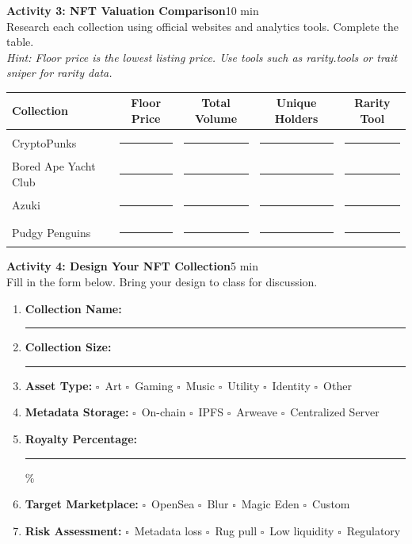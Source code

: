 \documentclass[11pt,a4paper]{article}
\newcommand{\activitybox}[3]{%
  \noindent\colorbox{mllavender4}{\parbox{\dimexpr\linewidth-2\fboxsep}{%
    \textbf{\color{mlpurple}#1}\hfill\textcolor{mlgray}{\small #2}\\[2pt]#3%
  }}\par\vspace{4pt}%
}
\newcommand{\fillcell}{\rule{2.2cm}{0.3pt}}
\begin{document}
\vspace{2pt}

\activitybox{Activity 3: NFT Valuation Comparison}{10 min}{%
Research each collection using official websites and analytics tools. Complete the table.\\[2pt]
\textit{Hint: Floor price is the lowest listing price. Use tools such as rarity.tools or trait sniper for rarity data.}
\begin{center}
\renewcommand{\arraystretch}{1.35}
\begin{tabular}{@{}lcccc@{}}
\toprule
\textbf{Collection} & \textbf{Floor Price} & \textbf{Total Volume} & \textbf{Unique Holders} & \textbf{Rarity Tool} \\
\midrule
CryptoPunks            & \fillcell & \fillcell & \fillcell & \fillcell \\
Bored Ape Yacht Club   & \fillcell & \fillcell & \fillcell & \fillcell \\
Azuki                  & \fillcell & \fillcell & \fillcell & \fillcell \\
Pudgy Penguins         & \fillcell & \fillcell & \fillcell & \fillcell \\
\bottomrule
\end{tabular}
\end{center}
}

\vspace{2pt}

\activitybox{Activity 4: Design Your NFT Collection}{5 min}{%
Fill in the form below. Bring your design to class for discussion.
\begin{enumerate}
\item \textbf{Collection Name:}~\rule{5cm}{0.3pt}
\item \textbf{Collection Size:}~\rule{3cm}{0.3pt}
\item \textbf{Asset Type:}\quad
      $\square$~Art\quad
      $\square$~Gaming\quad
      $\square$~Music\quad
      $\square$~Utility\quad
      $\square$~Identity\quad
      $\square$~Other
\item \textbf{Metadata Storage:}\quad
      $\square$~On-chain\quad
      $\square$~IPFS\quad
      $\square$~Arweave\quad
      $\square$~Centralized Server
\item \textbf{Royalty Percentage:}~\rule{1.5cm}{0.3pt}\%
\item \textbf{Target Marketplace:}\quad
      $\square$~OpenSea\quad
      $\square$~Blur\quad
      $\square$~Magic Eden\quad
      $\square$~Custom
\item \textbf{Risk Assessment:}\quad
      $\square$~Metadata loss\quad
      $\square$~Rug pull\quad
      $\square$~Low liquidity\quad
      $\square$~Regulatory
\end{enumerate}
}
\end{document}
